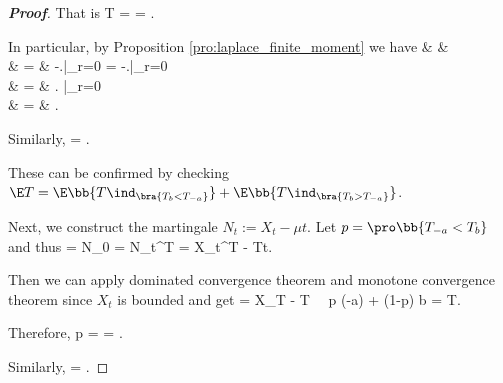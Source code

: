 \begin{proof}[\bf Proof]
That is
\be
\E T =  = .
\ee

In particular, by Proposition \ref{pro:laplace_finite_moment} %
we have
\beast
& & \E{} \\
& = &  -\left.\right|_{r=0} = -\left.\right|_{r=0}\\
& = & \left. \right|_{r=0} \\
& = & .
\eeast

Similarly,
\be
\E{} = .
\ee

These can be confirmed by checking $\E T = \E\bb{T \ind_{\bra{T_{b}<T_{-a}}}} + \E\bb{T \ind_{\bra{T_{b} > T_{-a}}}}$.

Next, we construct the martingale $N_t := X_t - \mu t$. Let $p=\pro\bb{T_{-a}<T_b}$ and thus
 = N_0 = \E N_t^T = \E X_t^T - \mu \E T\land t.
\ee

Then we can apply dominated convergence theorem and monotone convergence theorem since $X_t$ is bounded and get
 = \E X_T - \mu \E T \ \ra \ p (-a) + (1-p) b = \mu \E T.
\ee

Therefore,
\be
p =   = .
\ee

Similarly,
\be
\pro{} =  .
\ee
\end{proof}

